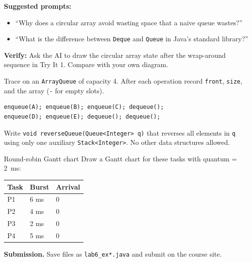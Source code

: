 \documentclass[11pt]{article}
\begin{document}
\begin{aicollab}
\textbf{Suggested prompts:}
\begin{itemize}[leftmargin=*,nosep]
  \item ``Why does a circular array avoid wasting space that a naive queue wastes?''
  \item ``What is the difference between \texttt{Deque} and \texttt{Queue} in Java's standard library?''
\end{itemize}
\medskip\textbf{Verify:} Ask the AI to draw the circular array state after the wrap-around sequence
in Try It 1. Compare with your own diagram.
\end{aicollab}

\takehomebanner

\begin{trace}
Trace on an \texttt{ArrayQueue} of capacity 4.
After each operation record \texttt{front}, \texttt{size}, and the array (\texttt{-} for empty slots).
\begin{lstlisting}
enqueue(A); enqueue(B); enqueue(C); dequeue();
enqueue(D); enqueue(E); dequeue(); dequeue();
\end{lstlisting}
\end{trace}

\begin{writecode}
Write \texttt{void reverseQueue(Queue<Integer> q)} that reverses all elements in \texttt{q}
using only one auxiliary \texttt{Stack<Integer>}. No other data structures allowed.
\end{writecode}

\begin{drawex}{Round-robin Gantt chart}
Draw a Gantt chart for these tasks with quantum = 2~ms:
\medskip
\begin{tabular}{@{}lll@{}}
\toprule
Task & Burst & Arrival \\ \midrule
P1 & 6 ms & 0 \\ P2 & 4 ms & 0 \\ P3 & 2 ms & 0 \\ P4 & 5 ms & 0 \\
\bottomrule
\end{tabular}
\end{drawex}

\vspace{4pt}
\noindent\textbf{Submission.} Save files as \texttt{lab6\_ex*.java} and submit on the course site.
\end{document}
